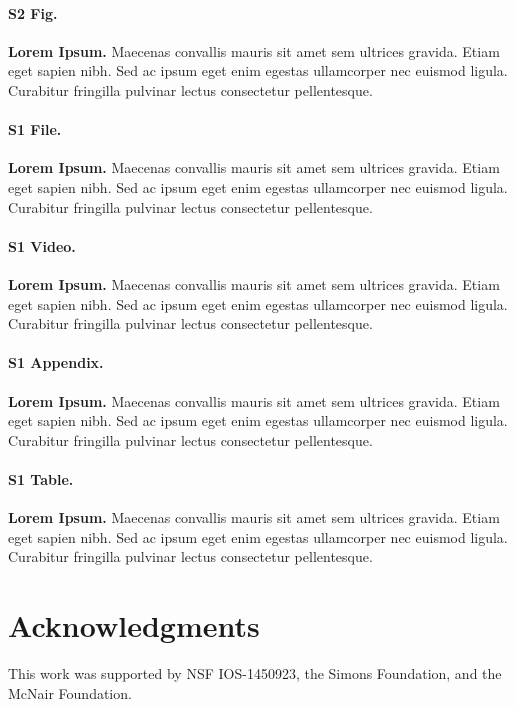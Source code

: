 \documentclass[10pt,letterpaper]{article}
\begin{document}
\paragraph*{S2 Fig.}
\label{S2_Fig}
{\bf Lorem Ipsum.} Maecenas convallis mauris sit amet sem ultrices gravida.
Etiam eget sapien nibh. Sed ac ipsum eget enim egestas ullamcorper nec euismod
ligula. Curabitur fringilla pulvinar lectus consectetur pellentesque.

\paragraph*{S1 File.}
\label{S1_File}
{\bf Lorem Ipsum.}  Maecenas convallis mauris sit amet sem ultrices gravida.
Etiam eget sapien nibh. Sed ac ipsum eget enim egestas ullamcorper nec euismod
ligula. Curabitur fringilla pulvinar lectus consectetur pellentesque.

\paragraph*{S1 Video.}
\label{S1_Video}
{\bf Lorem Ipsum.}  Maecenas convallis mauris sit amet sem ultrices gravida.
Etiam eget sapien nibh. Sed ac ipsum eget enim egestas ullamcorper nec euismod
ligula. Curabitur fringilla pulvinar lectus consectetur pellentesque.

\paragraph*{S1 Appendix.}
\label{S1_Appendix}
{\bf Lorem Ipsum.} Maecenas convallis mauris sit amet sem ultrices gravida.
Etiam eget sapien nibh. Sed ac ipsum eget enim egestas ullamcorper nec euismod
ligula. Curabitur fringilla pulvinar lectus consectetur pellentesque.

\paragraph*{S1 Table.}
\label{S1_Table}
{\bf Lorem Ipsum.} Maecenas convallis mauris sit amet sem ultrices gravida.
Etiam eget sapien nibh. Sed ac ipsum eget enim egestas ullamcorper nec euismod
ligula. Curabitur fringilla pulvinar lectus consectetur pellentesque.

\section*{Acknowledgments}

This work was supported by NSF IOS-1450923, the Simons Foundation, and the
McNair Foundation.

\nolinenumbers

%
%
% 


\end{document}
